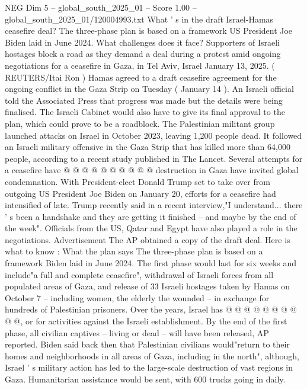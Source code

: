 \begin{textsample}{NEG Dim 5 – global\_south\_2025\_01 – Score 1.00 – global\_south\_2025\_01/120004993.txt}  \label{ex:f5_neg_160}
What ' s in the draft Israel-Hamas ceasefire deal?
The three-phase plan is based on a framework US President Joe Biden laid in June 2024.
What challenges does it face?
Supporters of Israeli hostages block a road as they demand a deal during a protest amid ongoing negotiations for a ceasefire in Gaza, in Tel Aviv, Israel January 13, 2025. ( REUTERS/Itai Ron ) Hamas agreed to a draft ceasefire agreement for the ongoing conflict in the Gaza Strip on Tuesday ( January 14 ).
An Israeli official told the Associated Press that progress was made but the details were being finalised.
The Israeli Cabinet would also have to give its final approval to the plan, which could prove to be a roadblock.
The Palestinian militant group launched attacks on Israel in October 2023, leaving 1,200 people dead.
It followed an Israeli military offensive in the Gaza Strip that has killed more than 64,000 people, according to a recent study published in The Lancet.
Several attempts for a ceasefire have @ @ @ @ @ @ @ @ @ @ destruction in Gaza have invited global condemnation.
With President-elect Donald Trump set to take over from outgoing US President Joe Biden on January 20, efforts for a ceasefire had intensified of late.
Trump recently said in a recent interview,"I understand... there ' s been a handshake and they are getting it finished -- and maybe by the end of the week".
Officials from the US, Qatar and Egypt have also played a role in the negotiations.
Advertisement The AP obtained a copy of the draft deal.
Here is what to know : What the plan says The three-phase plan is based on a framework Biden laid in June 2024.
The first phase would last for six weeks and include"a full and complete ceasefire", withdrawal of Israeli forces from all populated areas of Gaza, and release of 33 Israeli hostages taken by Hamas on October 7 -- including women, the elderly the wounded -- in exchange for hundreds of Palestinian prisoners.
Over the years, Israel has @ @ @ @ @ @ @ @ @ @, or for activities against the Israeli establishment.
By the end of the first phase, all civilian captives -- living or dead -- will have been released, AP reported.
Biden said back then that Palestinian civilians would"return to their homes and neighborhoods in all areas of Gaza, including in the north", although, Israel ' s military action has led to the large-scale destruction of vast regions in Gaza.
Humanitarian assistance would be sent, with 600 trucks going in daily.

\end{textsample}
